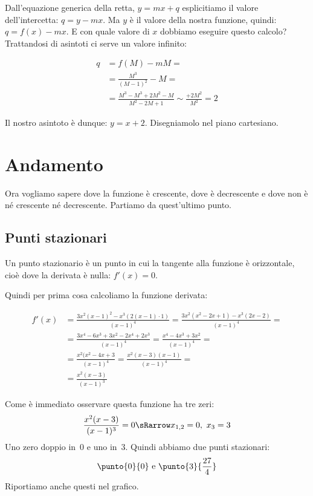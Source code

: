 Dall'equazione generica della retta, \(y=mx+q\) esplicitiamo il valore 
dell'intercetta: \(q=y-mx\). 
Ma \(y\) è il valore della nostra funzione, quindi: \(q=f(x)-mx\). 
E con quale valore di \(x\) dobbiamo eseguire questo calcolo? 
Trattandosi di asintoti ci serve un valore infinito:

\begin{minipage}{.60\linewidth}
\begin{align*}
 q &= f(M)-mM = \\
   &= \frac{M^3}{(M-1)^2}-M =\\
   &= \frac{M^3-M^3 +2M^2 -M}{M^2 -2M +1} \sim \frac{+2M^2}{M^2} = 2
\end{align*}

Il nostro asintoto è dunque: \(y=x+2\).
Disegniamolo nel piano cartesiano.
\end{minipage}
\hfill
\begin{minipage}{.38\linewidth}
 \begin{center}
\asintotifunzionea
 \end{center}
\end{minipage}

\section{Andamento}
\label{sec:03_andamento}

Ora vogliamo sapere dove la funzione è crescente, dove è decrescente e dove 
non è né crescente né decrescente. Partiamo da quest'ultimo punto.

\subsection{Punti stazionari}

Un punto stazionario è un punto in cui la tangente alla funzione è 
orizzontale, cioè dove la derivata è nulla: \(f'(x)=0\).

Quindi per prima cosa calcoliamo la funzione derivata:

\begin{align*}
f'(x) &= \frac{3x^2(x-1)^2-x^3(2(x-1)\cdot 1)}{(x-1)^4} =
       \frac{3x^2(x^2-2x+1)-x^3(2x-2)}{(x-1)^4} =\\
      &= \frac{3x^4-6x^3+3x^2-2x^4+2x^3}{(x-1)^4} =
       \frac{x^4-4x^3+3x^2}{(x-1)^4} =\\
      &= \frac{x^2(x^2-4x+3}{(x-1)^4} =
       \frac{x^2(x-3)(x-1)}{(x-1)^4} =\\
      &= \frac{x^2(x-3)}{(x-1)^3}
\end{align*}
\begin{minipage}{.60\linewidth}
Come è immediato osservare questa funzione ha tre zeri:
\[\frac{x^2(x-3)}{(x-1)^3}=0 \sRarrow x_{1,2}=0,~x_3=3\]
Uno zero doppio in~0 e uno in~3.
Quindi abbiamo due punti stazionari:
\[\punto{0}{0} \text{ e } \punto{3} {\frac{27}{4}}\]
Riportiamo anche questi nel grafico.
\end{minipage}
\hfill
\begin{minipage}{.38\linewidth}
 \begin{center}
\stazionarifunzionea
 \end{center}
\end{minipage}


